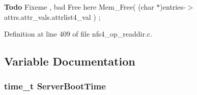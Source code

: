 \begin{Desc}
\item[{\bf Todo}]Fixeme , bad Free here Mem\_\-Free( (char $\ast$)entries-\/$>$attrs.attr\_\-vals.attrlist4\_\-val ) ; \end{Desc}


Definition at line 409 of file nfs4\_\-op\_\-readdir.c.

\subsection{Variable Documentation}
\subsubsection[{ServerBootTime}]{\setlength{\rightskip}{0pt plus 5cm}time\_\-t {\bf ServerBootTime}}\label{nfs4__op__readdir_8c_a7b4df488832bc1f60082b16b51472dc5}
